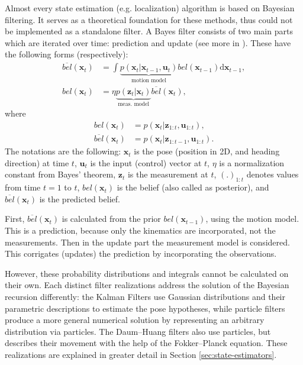 Almost every state estimation (e.g. localization) algorithm is based on Bayesian filtering.
It serves as a theoretical foundation for these methods, thus could not be implemented as a
standalone filter.
A Bayes filter consists of two main parts which are iterated over time: prediction and update (see more in \cite{Thrun2005}).
These have the following forms (respectively):
\begin{align}
    \overline{bel}(\mathbf{x}_t) & = \int \underbrace{p(\mathbf{x}_t | \mathbf{x}_{t-1},\mathbf{u}_t)}_{\text{motion model}}bel(\mathbf{x}_{t-1})\mathrm{d}\mathbf{x}_{t-1}, \label{eq:bayes-predict} \\
    bel(\mathbf{x}_t)            & = \eta \underbrace{p(\mathbf{\mathbf{z}}_t | \mathbf{x}_t)}_{\text{meas. model}}\overline{bel}(\mathbf{x}_t),
\end{align}
where
\begin{align}\label{key}
    bel(\mathbf{x}_t)            & = p(\mathbf{x}_t|\mathbf{z}_{1:t},\mathbf{u}_{1:t}),                      \\
    \overline{bel}(\mathbf{x}_t) & = p(\mathbf{x}_t|\mathbf{z}_{1:t-1},\mathbf{u}_{1:t}) \label{eq:predbel}.
\end{align}
The notations are the following: $\mathbf{x}_t$ is the pose (position in 2D, and heading direction) at time $t$,
$\mathbf{u}_t$ is the input (control) vector at $t$, $\eta$ is a normalization constant from  Bayes' theorem,
$\mathbf{z}_t$ is the measurement at $t$, $(.)_{1:t}$ denotes values from time $t = 1$ to $t$,
$bel(\mathbf{x}_t)$ is the belief (also called as posterior), and  $\overline{bel}(\mathbf{x}_t)$ is the predicted belief.

First, $\overline{bel}(\mathbf{x}_t)$ is calculated from the prior $bel(\mathbf{x}_{t-1})$, using the motion model.
This is a prediction, because only the kinematics are incorporated, not the measurements.
Then in the update part the measurement model is considered.
This corrigates (updates) the prediction by incorporating the observations.

However, these probability distributions and integrals cannot be calculated on their own.
Each distinct filter realizations address the solution of the Bayesian recursion differently:
the Kalman Filters use Gaussian distributions and their parametric descriptions to estimate the pose hypotheses,
while particle filters produce a more general numerical solution by representing an arbitrary distribution via particles.
The Daum--Huang filters also use particles, but describes their movement with the help of the Fokker--Planck equation.
These realizations are explained in greater detail in Section \ref{sec:state-estimators}.

